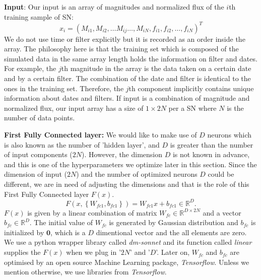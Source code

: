 \documentclass[useamsfonts]{pasj01}
\begin{document}
{\bf Input}: Our input is an array of magnitudes and normalized flux of the $i$th training sample of SN:
\begin{equation}
      x_i = \left( M_{i1}, M_{i2}, \ldots M_{ij} \ldots , M_{iN}, f_{i1}, f_{i2}, \ldots, f_{iN} \right)^T
\end{equation}
We do not use time or filter explicitly but it is recorded as an order inside the array.  The philosophy here is that the training set which is composed of the simulated data in the same array length holds the information on filter and dates.  For example, the $j$th magnitude in the array is the data taken on a certain date and by a certain filter.  The combination of the date and filter is identical to the ones in the training set.  Therefore, the $j$th component implicitly contains unique information about dates and filters.  
If input is a combination of magnitude and normalized flux,
our input array has a size of $1\times2N$ per a SN where $N$ is the number of data points.


{\bf First Fully Connected layer:}
We would like to make use of $D$ neurons which is also known as the number of 'hidden layer', and $D$ is greater than the number of input components ($2N$).  However, the dimension $D$ is not known in advance, and this is one of the hyperparameters we optimize later in this section.  Since the dimension of input ($2N$) and the number of optimized neurons $D$ could be different, we are in need of adjusting the dimensions and that is the role of this First Fully Connected layer $F(x)$.    
\begin{equation}
    F \left(x, \left\{W_{fc1},b_{fc1}\right\}\right) = W_{fc1} x + b_{fc1} \in \mathbb{R}^D.
\end{equation}
$F(x)$ is given by a linear combination of matrix $W_{fc} \in \mathbb{R}^{D\times 2N}$ and a vector $b_{fc} \in \mathbb{R}^D$. The initial value of $W_{fc}$ is generated by Gaussian distribution and $b_{fc}$ is initialized by $\mathbf{0}$, which is a $D$ dimentional vector and the all elements are zero.  We use a python wrapper library called {\it dm-sonnet} and its function called {\it linear} supplies the $F(x)$ when we plug in '$2N$' and '$D$'.  
Later on, $W_{fc}$ and $b_{fc}$ are optimised by an open source Machine Learning package, {\it Tensorflow}.  Unless we mention otherwise, we use libraries from {\it Tensorflow}.
\end{document}
